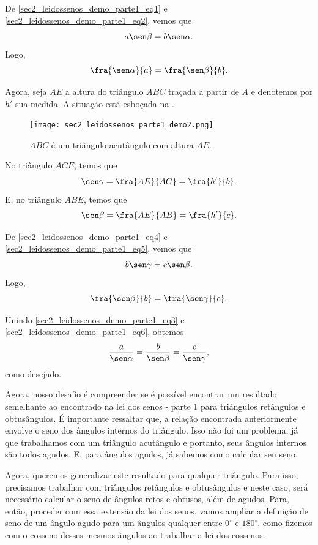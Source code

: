 De \eqref{sec2_leidossenos_demo_parte1_eq1} e \eqref{sec2_leidossenos_demo_parte1_eq2}, vemos que
$$a \sen\beta = b \sen\alpha.$$
Logo,
\begin{equation}
\fra{\sen\alpha}{a}=\fra{\sen\beta}{b}.    \label{sec2_leidossenos_demo_parte1_eq3}
\end{equation}

Agora, seja $AE$ a altura do triângulo $ABC$ traçada a partir de $A$ e denotemos por $h'$ sua medida. A situação está esboçada na .
\begin{figure}[H]
    \centering
    \texttt{[image: sec2\_leidossenos\_parte1\_demo2.png]}
    \caption{$ABC$ é um triângulo acutângulo com altura $AE$.}
    \label{sec2_leidossenos_parte1_demo2_fig}
\end{figure}

No triângulo $ACE$, temos que 
\begin{equation}
\sen\gamma=\fra{AE}{AC}=\fra{h'}{b}.    \label{sec2_leidossenos_demo_parte1_eq4}
\end{equation}
E, no triângulo $ABE$, temos que
\begin{equation}
\sen\beta=\fra{AE}{AB}=\fra{h'}{c}.    \label{sec2_leidossenos_demo_parte1_eq5}
\end{equation}

De \eqref{sec2_leidossenos_demo_parte1_eq4} e \eqref{sec2_leidossenos_demo_parte1_eq5}, vemos que
$$b \sen\gamma = c \sen\beta.$$
Logo,
\begin{equation}
\fra{\sen\beta}{b}=\fra{\sen\gamma}{c}.    \label{sec2_leidossenos_demo_parte1_eq6}
\end{equation}

Unindo \eqref{sec2_leidossenos_demo_parte1_eq3} e \eqref{sec2_leidossenos_demo_parte1_eq6}, obtemos
$$\frac{a}{\sen\alpha} = \frac{b}{\sen\beta} = \frac{c}{\sen\gamma},$$
como desejado.


Agora, nosso desafio é compreender se é possível encontrar um resultado semelhante ao encontrado na lei dos senos - parte 1 para triângulos retângulos e obtusângulos. É importante ressaltar que, a relação encontrada anteriormente envolve o seno dos ângulos internos do triângulo. Isso não foi um problema, já que trabalhamos com um triângulo acutângulo e portanto, seus ângulos internos são todos agudos. E, para ângulos agudos, já sabemos como calcular seu seno. 

Agora, queremos generalizar este resultado para qualquer triângulo. Para isso, precisamos trabalhar com triângulos retângulos e obtusângulos e neste caso, será necessário calcular o seno de ângulos retos e obtusos, além de agudos. Para, então, proceder com essa extensão da lei dos senos, vamos ampliar a definição de seno de um ângulo agudo para um ângulos qualquer entre $0^\circ$ e $180^\circ$, como fizemos com o cosseno desses mesmos ângulos ao trabalhar a lei dos cossenos. 

